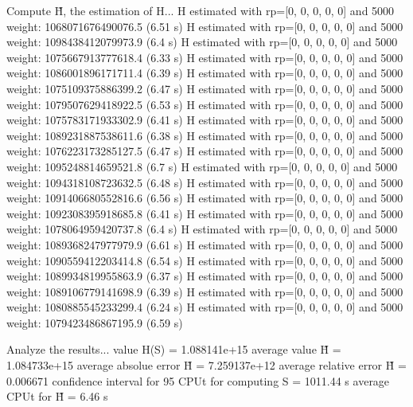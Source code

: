 Compute H̃, the estimation of H...
  H estimated with rp=[0, 0, 0, 0, 0] and 5000 weight:  1068071676490076.5  (6.51 s)
  H estimated with rp=[0, 0, 0, 0, 0] and 5000 weight:  1098438412079973.9  (6.4 s)
  H estimated with rp=[0, 0, 0, 0, 0] and 5000 weight:  1075667913777618.4  (6.33 s)
  H estimated with rp=[0, 0, 0, 0, 0] and 5000 weight:  1086001896171711.4  (6.39 s)
  H estimated with rp=[0, 0, 0, 0, 0] and 5000 weight:  1075109375886399.2  (6.47 s)
  H estimated with rp=[0, 0, 0, 0, 0] and 5000 weight:  1079507629418922.5  (6.53 s)
  H estimated with rp=[0, 0, 0, 0, 0] and 5000 weight:  1075783171933302.9  (6.41 s)
  H estimated with rp=[0, 0, 0, 0, 0] and 5000 weight:  1089231887538611.6  (6.38 s)
  H estimated with rp=[0, 0, 0, 0, 0] and 5000 weight:  1076223173285127.5  (6.47 s)
  H estimated with rp=[0, 0, 0, 0, 0] and 5000 weight:  1095248814659521.8  (6.7 s)
  H estimated with rp=[0, 0, 0, 0, 0] and 5000 weight:  1094318108723632.5  (6.48 s)
  H estimated with rp=[0, 0, 0, 0, 0] and 5000 weight:  1091406680552816.6  (6.56 s)
  H estimated with rp=[0, 0, 0, 0, 0] and 5000 weight:  1092308395918685.8  (6.41 s)
  H estimated with rp=[0, 0, 0, 0, 0] and 5000 weight:  1078064959420737.8  (6.4 s)
  H estimated with rp=[0, 0, 0, 0, 0] and 5000 weight:  1089368247977979.9  (6.61 s)
  H estimated with rp=[0, 0, 0, 0, 0] and 5000 weight:  1090559412203414.8  (6.54 s)
  H estimated with rp=[0, 0, 0, 0, 0] and 5000 weight:  1089934819955863.9  (6.37 s)
  H estimated with rp=[0, 0, 0, 0, 0] and 5000 weight:  1089106779141698.9  (6.39 s)
  H estimated with rp=[0, 0, 0, 0, 0] and 5000 weight:  1080885545233299.4  (6.24 s)
  H estimated with rp=[0, 0, 0, 0, 0] and 5000 weight:  1079423486867195.9  (6.59 s)

Analyze the results...
  value H(S)                  = 1.088141e+15 
  average value H̃             = 1.084733e+15 
  average absolue error H̃     = 7.259137e+12 
  average relative error H̃    = 0.006671 
  confidence interval for 95%
  CPUt for computing S         = 1011.44 s
  average CPUt for H̃           = 6.46 s

